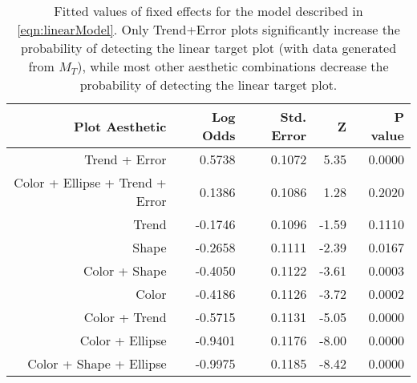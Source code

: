 \begin{table}[ht]
\centering
\begin{tabular}{rrrrr}
  \hline
Plot Aesthetic & Log Odds & Std. Error & Z & P value \\ 
  \hline
Trend + Error & 0.5738 & 0.1072 & 5.35 & 0.0000 \\ 
  Color + Ellipse + Trend + Error & 0.1386 & 0.1086 & 1.28 & 0.2020 \\ 
  Trend & -0.1746 & 0.1096 & -1.59 & 0.1110 \\ 
  Shape & -0.2658 & 0.1111 & -2.39 & 0.0167 \\ 
  Color + Shape & -0.4050 & 0.1122 & -3.61 & 0.0003 \\ 
  Color & -0.4186 & 0.1126 & -3.72 & 0.0002 \\ 
  Color + Trend & -0.5715 & 0.1131 & -5.05 & 0.0000 \\ 
  Color + Ellipse & -0.9401 & 0.1176 & -8.00 & 0.0000 \\ 
  Color + Shape + Ellipse & -0.9975 & 0.1185 & -8.42 & 0.0000 \\ 
   \hline
\end{tabular}
\caption[Fixed effects for linear target logistic model]{Fitted values of fixed effects for the model described in \eqref{eqn:linearModel}. Only Trend+Error plots significantly increase the probability of detecting the linear target plot (with data generated from $M_T$), while most other aesthetic combinations decrease the probability of detecting the linear target plot.} 
\label{tab:line.fixef}
\end{table}
